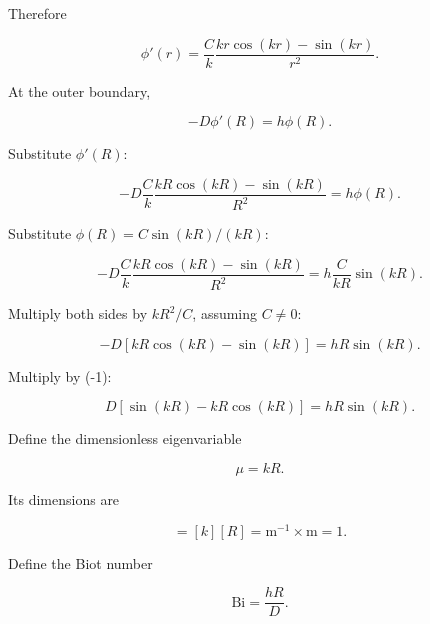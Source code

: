 \documentclass[11pt,a4paper]{article}
\begin{document}
Therefore

\begin{equation}
\boxed{
\phi'(r)
=
\frac{C}{k}
\frac{
kr\cos(kr)-\sin(kr)
}{
r^2
}.
}
\tag{TRISO-ANA-283}
\label{eq:triso-ana-283}
\end{equation}

At the outer boundary,

\begin{equation}
-D\phi'(R)=h\phi(R).
\tag{TRISO-ANA-284}
\label{eq:triso-ana-284}
\end{equation}

Substitute $\phi'(R)$:

\begin{equation}
-D
\frac{C}{k}
\frac{
kR\cos(kR)-\sin(kR)
}{
R^2
}
=
h\phi(R).
\tag{TRISO-ANA-285}
\label{eq:triso-ana-285}
\end{equation}

Substitute $\phi(R)=C\sin(kR)/(kR)$:

\begin{equation}
-D
\frac{C}{k}
\frac{
kR\cos(kR)-\sin(kR)
}{
R^2
}
=
h
\frac{C}{kR}
\sin(kR).
\tag{TRISO-ANA-286}
\label{eq:triso-ana-286}
\end{equation}

Multiply both sides by $kR^2/C$, assuming $C\ne0$:

\begin{equation}
-D
\left[
kR\cos(kR)-\sin(kR)
\right]
=
hR\sin(kR).
\tag{TRISO-ANA-287}
\label{eq:triso-ana-287}
\end{equation}

Multiply by (-1):

\begin{equation}
D
\left[
\sin(kR)-kR\cos(kR)
\right]
=
hR\sin(kR).
\tag{TRISO-ANA-288}
\label{eq:triso-ana-288}
\end{equation}

Define the dimensionless eigenvariable

\begin{equation}
\mu=kR.
\tag{TRISO-ANA-289}
\label{eq:triso-ana-289}
\end{equation}

Its dimensions are

\begin{equation}
[\mu]=[k][R]=\mathrm{m^{-1}}\times\mathrm m=1.
\tag{TRISO-ANA-290}
\label{eq:triso-ana-290}
\end{equation}

Define the Biot number

\begin{equation}
\mathrm{Bi}=\frac{hR}{D}.
\tag{TRISO-ANA-291}
\label{eq:triso-ana-291}
\end{equation}
\end{document}
